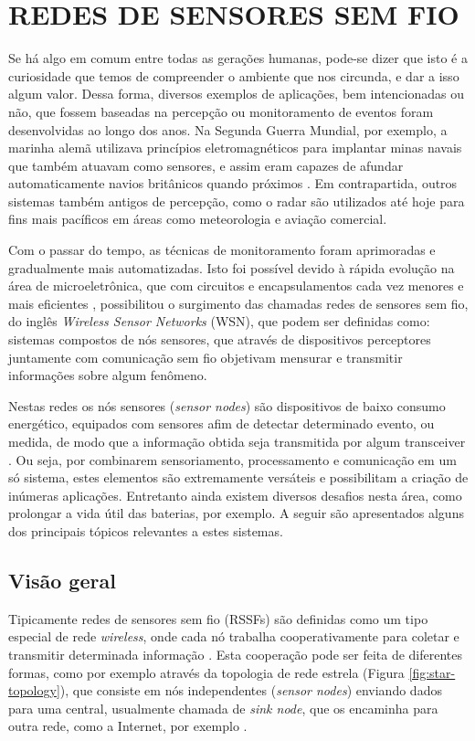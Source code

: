 \documentclass[oneside,openright,12pt]{ufsm_2015} %
\begin{document}
\section{REDES DE SENSORES SEM FIO}
Se há algo em comum entre todas as gerações humanas, pode-se dizer que isto é a curiosidade que temos de compreender o ambiente que nos circunda, e dar a isso algum valor. Dessa forma, diversos exemplos de aplicações, bem intencionadas ou não, que fossem baseadas na percepção ou monitoramento de eventos foram desenvolvidas ao longo dos anos. Na Segunda Guerra Mundial, por exemplo, a marinha alemã utilizava princípios eletromagnéticos para implantar minas navais que também atuavam como sensores, e assim eram capazes de afundar automaticamente navios britânicos quando próximos \cite{HowBrita11:online}. Em contrapartida, outros sistemas também antigos de percepção, como o radar são utilizados até hoje para fins mais pacíficos em áreas como meteorologia e aviação comercial. 

Com o passar do tempo, as técnicas de monitoramento foram aprimoradas e gradualmente mais automatizadas. Isto foi possível devido à rápida evolução na área de microeletrônica, que com circuitos e encapsulamentos cada vez menores e mais eficientes \cite{renna2007evolution}, possibilitou o surgimento das chamadas redes de sensores sem fio, do inglês \textit{Wireless Sensor Networks} (WSN), que podem ser definidas como: sistemas compostos de nós sensores, que através de dispositivos perceptores juntamente com comunicação sem fio objetivam mensurar e transmitir informações sobre algum fenômeno. 

Nestas redes os nós sensores (\textit{sensor nodes}) são dispositivos de baixo consumo energético, equipados com sensores afim de detectar determinado evento, ou medida, de modo que a informação obtida seja transmitida por algum transceiver \cite{oliveira2011wireless}. Ou seja, por combinarem sensoriamento, processamento e comunicação em um só sistema, estes elementos são extremamente versáteis e possibilitam a criação de inúmeras aplicações. Entretanto ainda existem diversos desafios nesta área, como prolongar a vida útil das baterias, por exemplo. A seguir são apresentados alguns dos principais tópicos relevantes a estes sistemas.

\subsection{Visão geral}
Tipicamente redes de sensores sem fio (RSSFs) são definidas como um tipo especial de rede \textit{wireless}, onde cada nó trabalha cooperativamente para coletar e transmitir determinada informação \cite{loureiro2003redes}. Esta cooperação pode ser feita de diferentes formas, como por exemplo através da topologia de rede estrela (Figura \ref{fig:star-topology}), que consiste em nós independentes (\textit{sensor nodes}) enviando dados para uma central, usualmente chamada de \textit{sink node}, que os encaminha para outra rede, como a Internet, por exemplo \cite{buratti2009overview}. 
\end{document}
